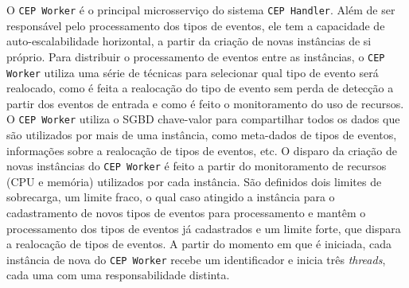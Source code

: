 O \texttt{CEP Worker} é o principal microsserviço do sistema \texttt{CEP Handler}. Além de ser responsável pelo processamento dos tipos de eventos, ele tem a capacidade de auto-escalabilidade horizontal, a partir da criação de novas instâncias de si próprio. Para distribuir o processamento de eventos entre as instâncias, o \texttt{CEP Worker} utiliza uma série de técnicas para selecionar qual tipo de evento será realocado, como é feita a realocação do tipo de evento sem perda de detecção a partir dos eventos de entrada e como é feito o monitoramento do uso de recursos. O \texttt{CEP Worker} utiliza o SGBD chave-valor para compartilhar todos os dados que são utilizados por mais de uma instância, como meta-dados de tipos de eventos, informações sobre a realocação de tipos de eventos, etc. O disparo da criação de novas instâncias do \texttt{CEP Worker} é feito a partir do monitoramento de recursos (CPU e memória) utilizados por cada instância. São definidos dois limites de sobrecarga, um limite fraco, o qual caso atingido a instância para o cadastramento de novos tipos de eventos para processamento e mantêm o processamento dos tipos de eventos já cadastrados e um limite forte, que dispara a realocação de tipos de eventos. A partir do momento em que é iniciada, cada instância de nova do \texttt{CEP Worker} recebe um identificador e inicia três \textit{threads}, cada uma com uma responsabilidade distinta. 



